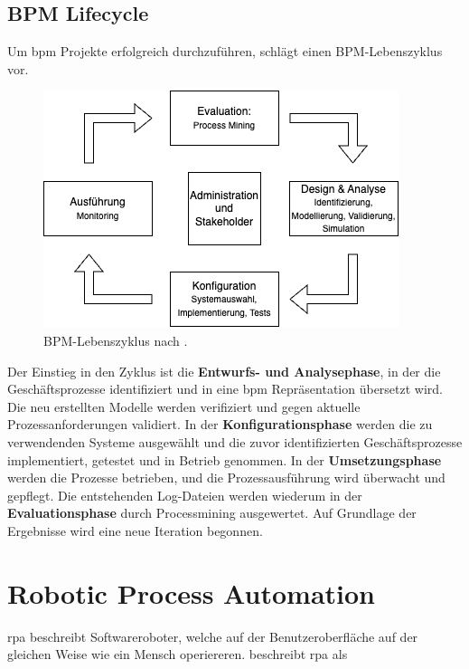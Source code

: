     \subsection{BPM Lifecycle}
        Um \gls{bpm} Projekte erfolgreich durchzuführen, schlägt \citet{Weske2019} einen BPM-Lebenszyklus vor. 

        \begin{figure}[H]
            \includegraphics[width=\textwidth]{../assets/images/BPM-Lebenszyklus.drawio.png}
            \caption{BPM-Lebenszyklus nach \citet{Weske2019}.}
            \end{figure}
    
        Der Einstieg in den Zyklus ist die \textbf{Entwurfs- und Analysephase}, in der die Geschäftsprozesse identiﬁziert und in eine \gls{bpm} Repräsentation übersetzt wird. Die neu erstellten Modelle werden veriﬁziert und gegen aktuelle Prozessanforderungen validiert. In der \textbf{Konﬁgurationsphase} werden die zu verwendenden Systeme ausgewählt und die zuvor identifizierten Geschäftsprozesse implementiert, getestet und in Betrieb genommen. In der \textbf{Umsetzungsphase} werden die Prozesse betrieben, und die Prozessausführung wird überwacht und gepflegt. Die entstehenden Log-Dateien werden wiederum in der \textbf{Evaluationsphase} durch Processmining ausgewertet. Auf Grundlage der Ergebnisse wird eine neue Iteration begonnen.
    
    \section{Robotic Process Automation}
    \gls{rpa} beschreibt Softwareroboter, welche auf der Benutzeroberfläche auf der gleichen Weise wie ein Mensch operiereren. \citet{vanderAalst2018} beschreibt \gls{rpa} als 




